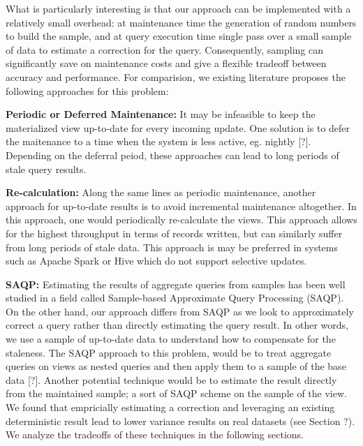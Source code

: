 What is particularly interesting is that our approach can be implemented with a relatively small overhead: at maintenance time the generation of random numbers to build the sample, and at query execution time single pass over a small sample of data to estimate a correction for the query.
Consequently, sampling can significantly save on maintenance costs and give a flexible tradeoff between accuracy and performance.
For comparision, we existing literature proposes the following approaches for this problem: 
\vspace{1em}

\noindent\textbf{Periodic or Deferred Maintenance: }
It may be infeasible to keep the materialized view up-to-date for every incoming update.
One solution is to defer the maitenance to a time when the system is less active, eg. nightly [?].
Depending on the deferral peiod, these approaches can lead to long periods of stale query results.

\vspace{1em}

\noindent\textbf{Re-calculation: }
Along the same lines as periodic maintenance, another approach 
for up-to-date results is to avoid incremental maintenance altogether.
In this approach, one would periodically re-calculate the views.
This approach allows for the highest throughput in terms of records written, but can
similarly suffer from long periods of stale data.
This approach is may be preferred in systems such as Apache Spark or Hive which do not support
selective updates. 

\vspace{1em}

\noindent\textbf{SAQP: }
Estimating the results of aggregate queries from samples has been
well studied in a field called Sample-based Approximate Query Processing
(SAQP). On the other hand, our approach differs from SAQP as we look to
approximately correct a query rather than directly estimating the query result.
In other words, we use a sample of up-to-date data to understand how to compensate for the
staleness. The SAQP approach to this problem, would be to treat aggregate
queries on views as nested queries and then apply them to a sample
of the base data {[}?{]}. Another potential technique would be to
estimate the result directly from the maintained sample; a sort of
SAQP scheme on the sample of the view. We found that empricially estimating
a correction and leveraging an existing deterministic result lead
to lower variance results on real datasets (see Section ?). We analyze
the tradeoffs of these techniques in the following sections.

